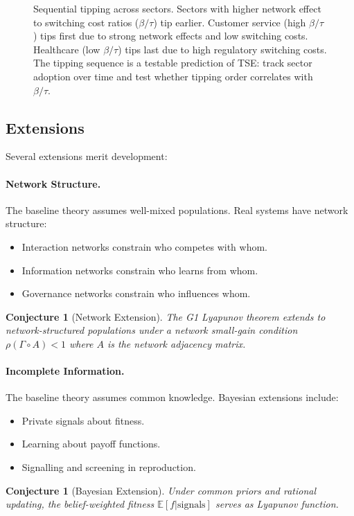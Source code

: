 \documentclass[12pt]{article}
\newtheorem{conjecture}[theorem]{Conjecture}
\newcommand{\E}{\mathbb{E}}
\begin{document}
\begin{figure}[h]
\caption{Sequential tipping across sectors. Sectors with higher network effect to switching cost ratios ($\beta/\tau$) tip earlier. Customer service (high $\beta/\tau$) tips first due to strong network effects and low switching costs. Healthcare (low $\beta/\tau$) tips last due to high regulatory switching costs. The tipping sequence is a testable prediction of TSE: track sector adoption over time and test whether tipping order correlates with $\beta/\tau$.}
\label{fig:sequential-tipping}
\end{figure}

\subsection{Extensions}

Several extensions merit development:

\paragraph{Network Structure.} The baseline theory assumes well-mixed populations. Real systems have network structure:
\begin{itemize}
    \item Interaction networks constrain who competes with whom.
    \item Information networks constrain who learns from whom.
    \item Governance networks constrain who influences whom.
\end{itemize}
\begin{conjecture}[Network Extension]
The G1 Lyapunov theorem extends to network-structured populations under a network small-gain condition $\rho(\Gamma \circ A) < 1$ where $A$ is the network adjacency matrix.
\end{conjecture}

\paragraph{Incomplete Information.} The baseline theory assumes common knowledge. Bayesian extensions include:
\begin{itemize}
    \item Private signals about fitness.
    \item Learning about payoff functions.
    \item Signalling and screening in reproduction.
\end{itemize}
\begin{conjecture}[Bayesian Extension]
Under common priors and rational updating, the belief-weighted fitness $\E[f | \text{signals}]$ serves as Lyapunov function.
\end{conjecture}
\end{document}
